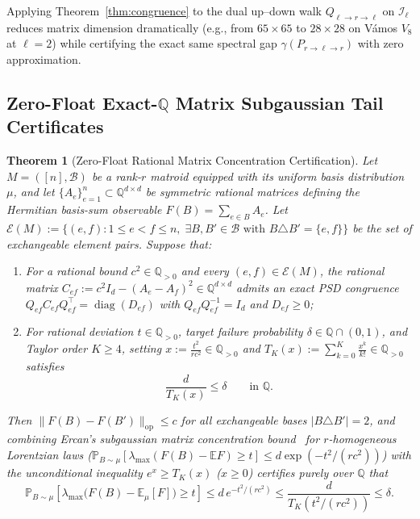 \documentclass[11pt,a4paper]{article}
\newtheorem{theorem}{Theorem}[section]
\theoremstyle{definition}
\theoremstyle{remark}
\newcommand{\QQ}{\mathbb{Q}}
\newcommand{\diag}{\operatorname{diag}}
\begin{document}
Applying Theorem~\ref{thm:congruence} to the dual up--down walk $Q_{\ell\to r\to\ell}$ on $\mathcal{I}_\ell$ reduces matrix dimension dramatically (e.g., from $65\times 65$ to $28\times 28$ on V\'amos $V_8$ at $\ell=2$) while certifying the exact same spectral gap $\gamma(P_{r\to\ell\to r})$ with zero approximation.

\subsection{Zero-Float Exact-\texorpdfstring{$\QQ$}{Q} Matrix Subgaussian Tail Certificates}

\begin{theorem}[Zero-Float Rational Matrix Concentration Certification]\label{thm:matrix-tail}
Let $M = ([n], \mathcal{B})$ be a rank-$r$ matroid equipped with its uniform basis distribution $\mu$, and let $\{A_e\}_{e=1}^n \subset \QQ^{d\times d}$ be symmetric rational matrices defining the Hermitian basis-sum observable $F(B) = \sum_{e\in B} A_e$. Let $\mathcal{E}(M) := \{(e, f) : 1 \le e < f \le n,\; \exists B, B' \in \mathcal{B} \text{ with } B \triangle B' = \{e, f\}\}$ be the set of exchangeable element pairs. Suppose that:
\begin{enumerate}[leftmargin=1.8em,itemsep=2pt]
  \item For a rational bound $c^2 \in \QQ_{>0}$ and every $(e, f) \in \mathcal{E}(M)$, the rational matrix $C_{ef} := c^2 I_d - (A_e - A_f)^2 \in \QQ^{d\times d}$ admits an exact PSD congruence $Q_{ef} C_{ef} Q_{ef}^\top = \diag(D_{ef})$ with $Q_{ef} Q_{ef}^{-1} = I_d$ and $D_{ef} \ge 0$;
  \item For rational deviation $t \in \QQ_{>0}$, target failure probability $\delta \in \QQ \cap (0, 1)$, and Taylor order $K \ge 4$, setting $x := \frac{t^2}{r c^2} \in \QQ_{>0}$ and $T_K(x) := \sum_{k=0}^K \frac{x^k}{k!} \in \QQ_{>0}$ satisfies
  \begin{equation}\label{eq:taylor-tail}
    \frac{d}{T_K(x)} \le \delta \qquad \text{in }\QQ.
  \end{equation}
\end{enumerate}
Then $\|F(B) - F(B')\|_{\mathrm{op}} \le c$ for all exchangeable bases $|B \triangle B'| = 2$, and combining Ercan's subgaussian matrix concentration bound~\cite{ercan2026lorentzian} for $r$-homogeneous Lorentzian laws ($\mathbb{P}_{B\sim\mu}[\lambda_{\max}(F(B)-\mathbb{E}F) \ge t] \le d\exp(-t^2/(r c^2))$) with the unconditional inequality $e^x \ge T_K(x)$ ($x \ge 0$) certifies purely over $\QQ$ that
\begin{equation}
  \mathbb{P}_{B\sim\mu}\!\left[\lambda_{\max}\!\bigl(F(B) - \mathbb{E}_\mu[F]\bigr) \ge t\right] \le d\, e^{-t^2/(r c^2)} \le \frac{d}{T_K(t^2/(r c^2))} \le \delta.
\end{equation}
\end{theorem}
\end{document}

